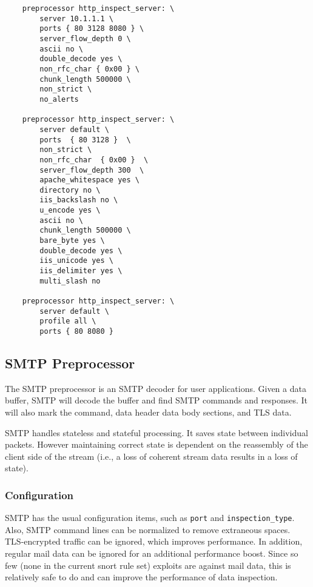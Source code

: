 \documentclass[english]{report}
\begin{document}
\begin{verbatim}
    preprocessor http_inspect_server: \
        server 10.1.1.1 \
        ports { 80 3128 8080 } \
        server_flow_depth 0 \
        ascii no \
        double_decode yes \
        non_rfc_char { 0x00 } \
        chunk_length 500000 \
        non_strict \
        no_alerts

    preprocessor http_inspect_server: \
        server default \ 
        ports  { 80 3128 }  \
        non_strict \
        non_rfc_char  { 0x00 }  \
        server_flow_depth 300  \
        apache_whitespace yes \
        directory no \
        iis_backslash no \
        u_encode yes \
        ascii no \
        chunk_length 500000 \
        bare_byte yes \
        double_decode yes \
        iis_unicode yes \ 
        iis_delimiter yes \
        multi_slash no

    preprocessor http_inspect_server: \
        server default \
        profile all \
        ports { 80 8080 }
\end{verbatim}

\subsection{SMTP Preprocessor}
\label{SMTP}

The SMTP preprocessor is an SMTP decoder for user applications.  Given a data
buffer, SMTP will decode the buffer and find SMTP commands and responses.  It
will also mark the command, data header data body sections, and TLS data.

SMTP handles stateless and stateful processing.  It saves state between
individual packets.  However maintaining correct state is dependent on the
reassembly of the client side of the stream (i.e., a loss of coherent stream data
results in a loss of state).

\subsubsection{Configuration}

SMTP has the usual configuration items, such as \texttt{port} and
\texttt{inspection\_type}.  Also, SMTP command lines can be normalized to
remove extraneous spaces.  TLS-encrypted traffic can be ignored, which improves
performance.  In addition, regular mail data can be ignored for an additional
performance boost.  Since so few (none in the current snort rule set) exploits
are against mail data, this is relatively safe to do and can improve the
performance of data inspection.
\end{document}
